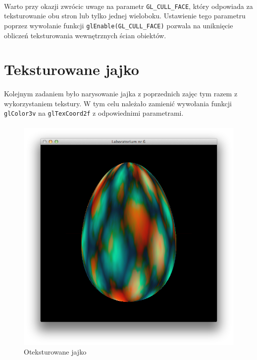 \documentclass[wide,a4paper,titlepage,12pt] {article}
\begin{document}
  \paragraph{}
  Warto przy okazji zwrócic uwage na parametr \texttt{GL\_CULL\_FACE}, który odpowiada za teksturowanie obu stron lub tylko jednej wieloboku. Ustawienie tego parametru poprzez wywołanie funkcji \texttt{glEnable(GL\_CULL\_FACE)} pozwala na uniknięcie obliczeń teksturowania wewnętrznych ścian obiektów.\texttt{}


  \newpage

  \section{Teksturowane jajko}
  \paragraph{}
  Kolejnym zadaniem było narysowanie jajka z poprzednich zajęc tym razem z wykorzystaniem tekstury. W tym celu należało zamienić wywołania funkcji \texttt{glColor3v} na \texttt{glTexCoord2f} z odpowiednimi parametrami.

  \paragraph{}
  


  \begin{figure}[h!]
    \begin{center}
      \includegraphics[width=\textwidth]{3.png}
      \caption{Oteksturowane jajko}
    \end{center}
  \end{figure}
\end{document}
